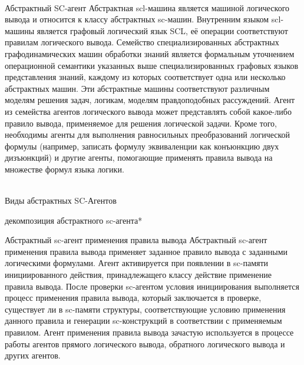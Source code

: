 \begin{frame}{\\Абстрактный SC-агент}
\vspace{12mm}
Абстрактная scl-машина является машиной логического вывода и относится к классу абстрактных sc-машин. Внутренним языком scl-машины является графовый логический язык SCL, её операции соответствуют правилам логического вывода. Семейство специализированных абстрактных графодинамических машин обработки знаний является формальным уточнением операционной семантики указанных выше специализированных графовых языков представления знаний, каждому из которых соответствует одна или несколько абстрактных машин. Эти абстрактные машины соответствуют различным моделям решения задач, логикам, моделям правдоподобных рассуждений. Агент из семейства агентов логического вывода может представлять собой какое-либо правило вывода, применяемое для решения логической задачи. Кроме того, необходимы агенты для выполнения равносильных преобразований логической формулы (например, записать формулу эквиваленции как конъюнкцию двух дизъюнкций) и другие агенты, помогающие применять правила вывода на множестве формул языка логики.
\end{frame}

\begin{frame}{\\Виды абстрактных SC-Агентов}  
		\begin{scnrelfromset}{декомпозиция абстрактного sc-агента*}
		\end{scnrelfromset}	
\end{frame}

\begin{frame}{\Large Абстрактный sc-агент применения правила вывода}
\vspace{8mm}
  Абстрактный sc-агент применения правила вывода применяет заданное правило вывода с заданными логическими формулами. Агент активируется при появлении в sc-памяти инициированного действия, принадлежащего классу действие применение правила вывода. После проверки sc-агентом условия инициирования выполняется процесс применения правила вывода, который заключается в проверке, существует ли в sc-памяти структуры, соответствующие условию применения данного правила и генерации sc-конструкций в соответствии с применяемым правилом. Агент применения правила вывода зачастую используется в процессе работы агентов прямого логического вывода, обратного логического вывода и других агентов.  
\end{frame}

